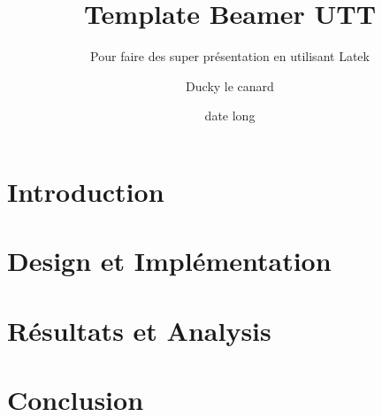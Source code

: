 \documentclass[A4,svgnames,9pt,aspectratio=169]{beamer}
\title[titrecourt]{Template Beamer UTT}
\subtitle{Pour faire des super présentation en utilisant Latek}
\date[00/00/202X]{date long}
\author[A. et al.]{Ducky le canard}
\begin{document}
\frame{\titlepage}

\renewcommand{\contentsname}{Sommaire}

\section{Introduction}


\section{Design et Implémentation}


\section{Résultats et Analysis}



\section{Conclusion}



\appendix
\frame{\merci}




\end{document}
